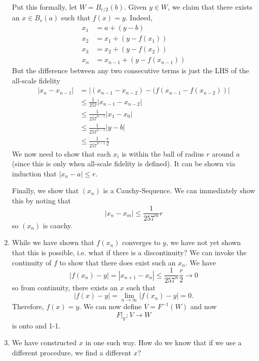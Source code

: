 \documentclass{article}
\begin{document}
\begin{enumerate}
          Put this formally, let $W=B_{r/2}(b).$ Given $y\in W$, we claim that there exists an $x\in B_r(a)$ such that $f(x)=y.$ Indeed,
          \begin{align}
              x_1 & = a+(y-b)                  \\
              x_2 & = x_1+(y-f(x_1))           \\
              x_3 & = x_2+(y-f(x_2))           \\
              x_n & = x_{n-1} + (y-f(x_{n-1}))
          \end{align}
          But the difference between any two consecutive terms is just the LHS of the all-scale fidelity
          \begin{align}
              |x_n-x_{n-1}| & = |(x_{n-1}-x_{n-2})-(f(x_{n-1}-f(x_{n-2}))| \\
                            & \le \frac{1}{257}|x_{n-1}-x_{n-2}|           \\
                            & \le \frac{1}{257^{n-1}} |x_1-x_0|            \\
                            & \le \frac{1}{257^{n-1}} | y-b|               \\
                            & \le \frac{1}{257^{n-1}} \frac{r}{2}
          \end{align}
          We now need to show that each $x_i$ is within the ball of radius $r$ around $a$ (since this is only when all-scale fidelity is defined). It can be shown via induction that $|x_n-a| \le r.$

          Finally, we show that $(x_n)$ is a Cauchy-Sequence. We can immediately show this by noting that
          \begin{equation}
              |x_n-x_m| \le \frac{1}{257^m}r
          \end{equation}
          so $(x_n)$ is cauchy.
    \item While we have shown that $f(x_n)$ converges to $y$, we have not yet shown that this is possible, i.e. what if there is a discontinuity? We can invoke the continuity of $f$ to show that there does exist such an $x_n.$ We have
          \begin{equation}
              |f(x_n)-y| = |x_{n+1}-x_n| \le \frac{1}{257^n}\frac{r}{2} \rightarrow 0
          \end{equation}
          so from continuity, there exists an $x$ such that
          \begin{equation}
              |f(x)-y| = \lim_{n\to \infty} |f(x_n)-y|  = 0.
          \end{equation}
          Therefore, $f(x)=y.$ We can now define $V=F^{-1}(W)$ and now
          \begin{equation}
              F|_V: V\rightarrow W
          \end{equation}
          is onto and 1-1.
    \item We have constructed $x$ in one such way. How do we know that if we use a different procedure, we find a different $x$?


\end{enumerate}
\end{document}
